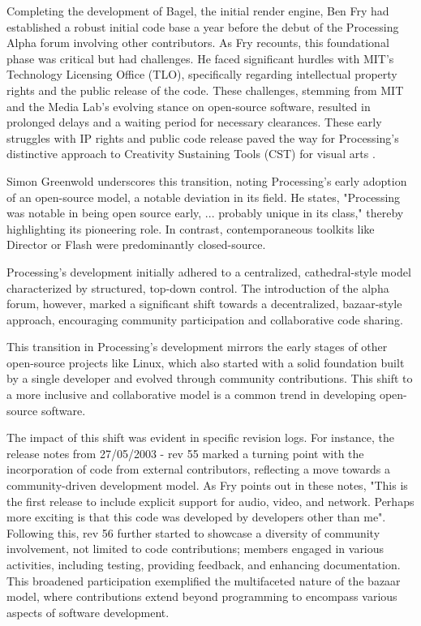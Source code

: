 



Completing the development of Bagel, the initial render engine, Ben Fry had established a robust initial code base a year before the debut of the Processing Alpha forum involving other contributors. As Fry recounts, this foundational phase was critical but had challenges. He faced significant hurdles with MIT's Technology Licensing Office (TLO), specifically regarding intellectual property rights and the public release of the code. These challenges, stemming from MIT and the Media Lab's evolving stance on open-source software, resulted in prolonged delays and a waiting period for necessary clearances. These early struggles with IP rights and public code release paved the way for Processing's distinctive approach to Creativity Sustaining Tools (CST) for visual arts \parencite{shneidermanCreativitySupportTools2002}.

Simon Greenwold underscores this transition, noting Processing's early adoption of an open-source model, a notable deviation in its field. He states, "Processing was notable in being open source early, ... probably unique in its class," thereby highlighting its pioneering role. In contrast, contemporaneous toolkits like Director or Flash were predominantly closed-source.

Processing's development initially adhered to a centralized, cathedral-style model characterized by structured, top-down control. The introduction of the alpha forum, however, marked a significant shift towards a decentralized, bazaar-style approach, encouraging community participation and collaborative code sharing.

This transition in Processing's development mirrors the early stages of other open-source projects like Linux, which also started with a solid foundation built by a single developer and evolved through community contributions. This shift to a more inclusive and collaborative model is a common trend in developing open-source software.

The impact of this shift was evident in specific revision logs. For instance, the release notes from 27/05/2003 - rev 55 marked a turning point with the incorporation of code from external contributors, reflecting a move towards a community-driven development model. As Fry points out in these notes, "This is the first release to include explicit support for audio, video, and network. Perhaps more exciting is that this code was developed by developers other than me". Following this, rev 56 further started to showcase a diversity of community involvement, not limited to code contributions; members engaged in various activities, including testing, providing feedback, and enhancing documentation. This broadened participation exemplified the multifaceted nature of the bazaar model, where contributions extend beyond programming to encompass various aspects of software development.

